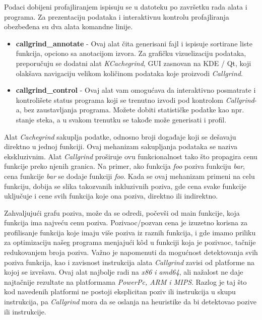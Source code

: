 \documentclass[12pt,oneside]{memoir}
\theoremstyle{plain}
\theoremstyle{definition}
\begin{document}
Podaci dobijeni profajliranjem ispisuju se u datoteku po završetku rada alata i programa. Za prezentaciju podataka i interaktivnu kontrolu profajliranja obezbeđena su dva alata komandne linije.
\begin{itemize}
\item \textbf{callgrind\_annotate} - Ovaj alat čita generisani fajl i ispisuje sortirane liste funkcija, opciono sa anotacijom izvora. Za grafičku vizuelizaciju podataka, preporučuju se dodatni alat \textit{KCachegrind}, GUI zasnovan na KDE / Qt, koji olakšava navigaciju velikom količinom podataka koje proizvodi \textit{Callgrind}.
\item \textbf{callgrind\_control} - Ovaj alat vam omogućava da interaktivno posmatrate i kontrolišete status programa koji se trenutno izvodi pod kontrolom \textit{Callgrind}-a, bez zaustavljanja programa. Možete dobiti statističke podatke kao npr. stanje steka, a u svakom trenutku se takođe može generisati i profil.
\end{itemize}

Alat \textit{Cachegrind} sakuplja podatke, odnosno broji događaje koji se dešavaju direktno u jednoj funkciji. Ovaj mehanizam sakupljanja podataka se naziva ekskluzivnim. Alat \textit{Callgrind} proširuje ovu funkcionalnost tako što propagira cenu funkcije preko njenih granica. Na primer, ako funkcija \textit{foo} poziva funkciju \textit{bar}, cena funkcije \textit{bar} se dodaje funkciji \textit{foo}. Kada se ovaj mehanizam primeni na celu funkciju, dobija se slika takozvanih inkluzivnih poziva, gde cena svake funkcije uključuje i cene svih funkcija koje ona poziva, direktno ili indirektno.

Zahvaljujući grafu poziva, može da se odredi, počevši od main funkcije, koja funkcija ima najveću cenu poziva. Pozivaoc/pozvan cena je izuzetno korisna za profilisanje funkcija koje imaju više poziva iz raznih funkcija, i gde imamo priliku za optimizaciju našeg programa menjajući k\^od u funkciji koja je pozivaoc, tačnije redukovanjem broja poziva. Važno je napomenuti da mogućnost detektovanja svih poziva funkcija, kao i zavisnost instrukcija alata \textit{Callgrind} zavisi od platforme na kojoj se izvršava. Ovaj alat najbolje radi na \textit{x86 i amd64}, ali nažalost ne daje najtačnije rezultate na platformama \textit{PowerPc, ARM i MIPS}. Razlog je taj što kod navedenih platformi ne postoji eksplicitan poziv ili instrukcija u skupu instrukcija, pa \textit{Callgrind} mora da se oslanja na heuristike da bi detektovao pozive ili instrukcije.
\end{document}

